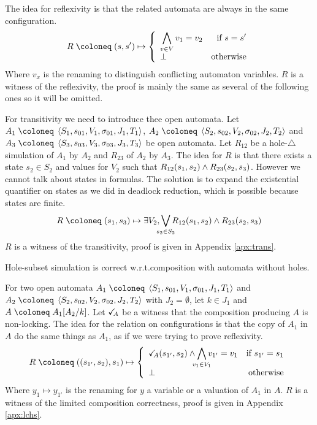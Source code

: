\documentclass{article}
\begin{document}
\begin{proofsketch}
The idea for reflexivity is that the related automata are always in the same configuration.
\[ R \defobject \mpar{s, s'} \mapsto \choice{\bigwedge_{v \in V} v_1 = v_2 & \text{if } s = s'\\ \bot & \text{otherwise}} \]
Where \(v_x\) is the renaming to distinguish conflicting automaton variables.
\(R\) is a witness of the reflexivity, the proof is mainly the same as several of the following ones so it will be omitted.

For transitivity we need to introduce thee open automata.
Let \(A_1 \defobject \OAg[1]\), \(A_2 \defobject \OAg[2]\) and \(A_3 \defobject \OAg[3]\) be open automata.
Let \(R_{12}\) be a hole-\(\triangle\) simulation of \(A_1\) by \(A_2\) and \(R_{23}\) of \(A_2\) by \(A_3\).
The idea for \(R\) is that there exists a state \(s_2 \in S_2\) and values for \(V_2\) such that \(R_{12}{\left(s_1, s_2\right)} \wedge R_{23}{\left(s_2, s_3\right)}\).
However we cannot talk about states in formulas.
The solution is to expand the existential quantifier on states as we did in deadlock reduction, which is possible because states are finite.
\[ R \defobject \mpar{s_1, s_3} \mapsto \exists V_2, \bigvee_\subbox{s_2 \in S_2} R_{12}\mpar{s_1, s_2} \wedge R_{23}\mpar{s_2, s_3} \]
\(R\) is a witness of the transitivity, proof is given in Appendix \ref{apx:trans}.
\end{proofsketch}
\begin{prop}\label{prop:cc'} Hole-subset simulation is correct w.r.t.\@ composition with automata without holes. \end{prop}
\begin{proofsketch}
For two open automata \(A_1 \defobject \OAg[1]\) and \(A_2 \defobject \OAg[2]\) with \(J_2 = \emptyset\), let \(k \in J_1\) and \(A \defobject A_1\subst{A_2}{k}\).
Let \(\checkmark_{\!\! A}\) be a witness that the composition producing \(A\) is non-locking.
The idea for the relation on configurations is that the copy of \(A_1\) in \(A\) do the same things as \(A_1\), as if we were trying to prove reflexivity.
\[ R \defobject \mpar{\mpar{s_{1'}, s_2}, s_1} \mapsto \choice{\reach{A}\mpar{s_{1'}, s_2} \wedge \bigwedge_\subbox{v_1 \in V_1} v_{1'} = v_1 & \text{if } s_{1'} = s_1 \\ \bot & \text{otherwise}} \]
Where \(y_1 \mapsto y_{1'}\) is the renaming for \(y\) a variable or a valuation of \(A_1\) in \(A\).
\(R\) is a witness of the limited composition correctness, proof is given in Appendix \ref{apx:lchs}.
\end{proofsketch}
\end{document}
